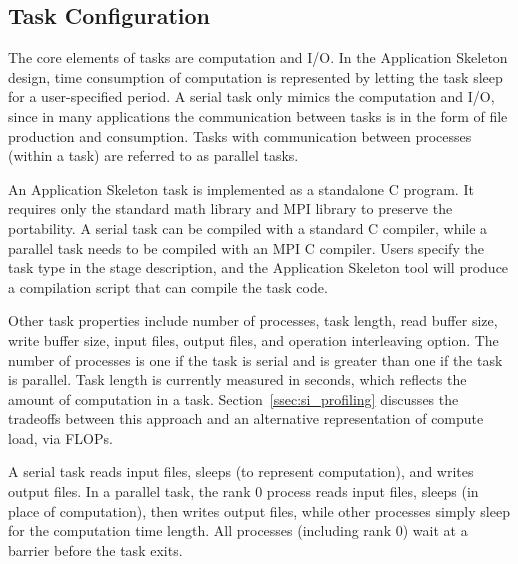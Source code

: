 \documentclass[preprint,12pt]{elsarticle}
\newcommand{\katznote}[1]{ {\textcolor{blue}    { ***Dan:   #1 }}}
\newcommand{\zhaonote}[1]{{\textcolor{darkgreen}{ ***Zhao:  #1 }}}
\newcommand{\katznote}[1]{}
\newcommand{\zhaonote}[1]{}
\begin{document}
\subsection{Task Configuration}
The core elements of tasks are computation and I/O. In the Application Skeleton design, time consumption of computation is represented
by letting the task sleep for a user-specified period.
A serial task
only mimics the computation and I/O, since in many applications the communication between tasks is in the form of file production and consumption. Tasks with communication between processes (within a task) are referred to as parallel tasks. 

An Application Skeleton task is implemented as a standalone C program. It  requires only the standard math library and MPI library to preserve the
portability. A serial task can be compiled with a standard C compiler, while a parallel task needs to be compiled with an MPI C compiler. Users specify the task type in the stage description, and the Application Skeleton tool will produce 
a compilation script that can compile the task code.

Other task properties include number of processes, task length, read buffer size, write buffer size, input files, output files, and
operation interleaving option. The number of processes is one if the task is serial and is greater than one if the task is parallel. 
Task length is currently measured in seconds, which reflects the amount of computation in a task. 
Section~\ref{ssec:si_profiling} discusses the tradeoffs between this approach and an
alternative representation of compute load, via FLOPs.

A serial task reads input files, sleeps (to represent computation), and writes output files. In a parallel task, the rank 0 process reads
input files, sleeps (in place of computation), then writes output files, while other processes simply sleep for the computation time length.  All processes (including rank 0) wait at a barrier before the task exits. 
\end{document}
